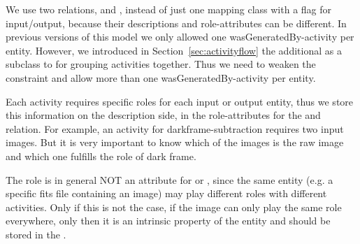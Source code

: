 We use two relations,  and , instead of just one
mapping class with a flag for input/output, because their descriptions and role-attributes
can be different. 
In previous versions of this model we only allowed one wasGeneratedBy-activity per 
entity. However, we introduced in Section~\ref{sec:activityflow} the additional  as 
a subclass to  for grouping activities together. Thus we need to 
weaken the constraint and allow more than one wasGeneratedBy-activity per entity. 

Each activity requires specific roles for each input or output entity, thus 
we store this information on the description side, in the role-attributes for 
the  and  relation.
For example, an activity for darkframe-subtraction requires two input images. But it is 
very important to know which of the images is the raw image and 
which one fulfills the role of dark frame.

The role is in general NOT an attribute for  or , 
since the same entity (e.g. a specific fits file containing an image) may play 
different roles with different activities. Only if this is not the case, if the 
image can only play the same role everywhere, only then it is an intrinsic 
property of the entity and should be stored in the .




